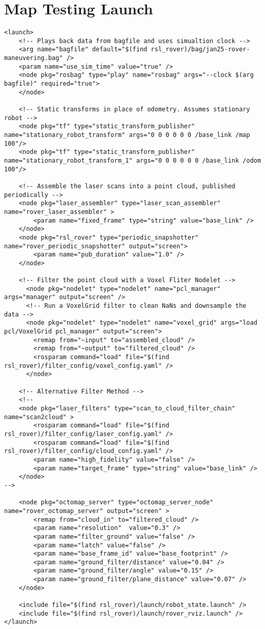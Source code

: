 \section{Map Testing Launch}
\begin{verbatim}
<launch> 
	<!-- Plays back data from bagfile and uses simualtion clock -->
	<arg name="bagfile" default="$(find rsl_rover)/bag/jan25-rover-maneuvering.bag" />
	<param name="use_sim_time" value="true" />
	<node pkg="rosbag" type="play" name="rosbag" args="--clock $(arg bagfile)" required="true">
	</node>

	<!-- Static transforms in place of odometry. Assumes stationary robot -->
	<node pkg="tf" type="static_transform_publisher" name="stationary_robot_transform" args="0 0 0 0 0 0 /base_link /map 100"/>
	<node pkg="tf" type="static_transform_publisher" name="stationary_robot_transform_1" args="0 0 0 0 0 0 /base_link /odom 100"/>

	<!-- Assemble the laser scans into a point cloud, published periodically -->
	<node pkg="laser_assembler" type="laser_scan_assembler" name="rover_laser_assembler" >
		<param name="fixed_frame" type="string" value="base_link" />
	</node>
	<node pkg="rsl_rover" type="periodic_snapshotter" name="rover_periodic_snapshotter" output="screen">
		<param name="pub_duration" value="1.0" />
	</node>

	<!-- Filter the point cloud with a Voxel Fliter Nodelet -->
	  <node pkg="nodelet" type="nodelet" name="pcl_manager" args="manager" output="screen" />
	  <!-- Run a VoxelGrid filter to clean NaNs and downsample the data -->
	  <node pkg="nodelet" type="nodelet" name="voxel_grid" args="load pcl/VoxelGrid pcl_manager" output="screen">
		<remap from="~input" to="assembled_cloud" />
		<remap from="~output" to="filtered_cloud" />
		<rosparam command="load" file="$(find rsl_rover)/filter_config/voxel_config.yaml" />
	  </node>

	<!-- Alternative Filter Method -->
	<!--
	<node pkg="laser_filters" type="scan_to_cloud_filter_chain" name="scan2cloud" >
		<rosparam command="load" file="$(find rsl_rover)/filter_config/laser_config.yaml" />
		<rosparam command="load" file="$(find rsl_rover)/filter_config/cloud_config.yaml" />
		<param name="high_fidelity" value="false" />
		<param name="target_frame" type="string" value="base_link" />
	</node>
-->

	<node pkg="octomap_server" type="octomap_server_node" name="rover_octomap_server" output="screen" >
		<remap from="cloud_in" to="filtered_cloud" />
		<param name="resolution"  value="0.3" />
		<param name="filter_ground" value="false" />
		<param name="latch" value="false" />
		<param name="base_frame_id" value="base_footprint" />
		<param name="ground_filter/distance" value="0.04" />
		<param name="ground_filter/angle" value="0.15" />
		<param name="ground_filter/plane_distance" value="0.07" />
	</node>

	<include file="$(find rsl_rover)/launch/robot_state.launch" />
	<include file="$(find rsl_rover)/launch/rover_rviz.launch" />
</launch>
\end{verbatim}




